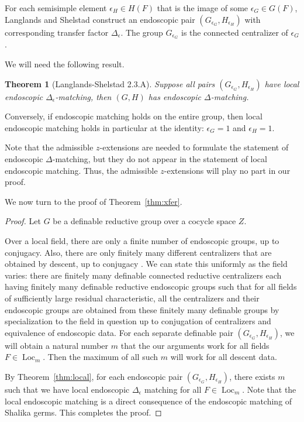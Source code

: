 \documentclass[12pt]{amsart}
\newcommand{\op}[1]{\operatorname{#1}}
\theoremstyle{plain}
\newtheorem{theorem}[thm]{Theorem}
\theoremstyle{definition}
\begin{document}
For each semisimple element $\epsilon_H \in H(F)$ that is the image of
some $\epsilon_G\in G(F)$, Langlands and Shelstad construct an
endoscopic pair $(G_{\epsilon_G},H_{\epsilon_H})$ with corresponding
transfer factor $\Delta_\epsilon$.  The group $G_{\epsilon_G}$ is the
connected centralizer of $\epsilon_G$.

We will need the following result.

\begin{theorem}[Langlands-Shelstad 2.3.A]  Suppose all pairs
  $(G_{\epsilon_G},H_{\epsilon_H})$ have local endoscopic
  $\Delta_\epsilon$-matching, then $(G,H)$ has endoscopic $\Delta$-matching.
\end{theorem}

Conversely, if endoscopic matching holds on the entire group, then
local endoscopic matching holds in particular at the identity:
$\epsilon_G = 1$ and $\epsilon_H =1$.

Note that the admissible $z$-extensions are needed to formulate the
statement of endoscopic $\Delta$-matching, but they do not appear in
the statement of local endoscopic matching.  Thus, the admissible
$z$-extensions will play no part in our proof.

We now turn to the proof of Theorem~\ref{thm:xfer}.

\begin{proof} Let $G$ be a definable reductive group over a cocycle
  space $Z$.

  Over a local field, there are only a finite number of endoscopic
  groups, up to conjugacy.  Also, there are only finitely many
  different centralizers that are obtained by descent, up to conjugacy
  \cite[Sec.2.2]{LSd}.  We can state this uniformly as the field
  varies: there are finitely many definable connected reductive
  centralizers each having finitely many definable reductive
  endoscopic groups such that for all fields of sufficiently large
  residual characteristic, all the centralizers and their endoscopic
  groups are obtained from these finitely many definable groups by
  specialization to the field in question up to conjugation of
  centralizers and equivalence of endoscopic data.  For each separate
  definable pair $(G_{\epsilon_G},H_{\epsilon_H})$, we will obtain a
  natural number $m$ that the our arguments work for all fields $F\in
  \op{Loc}_m$.  Then the maximum of all such $m$ will work for all
  descent data.

  By Theorem~\ref{thm:local}, for each endoscopic pair
  $(G_{\epsilon_G},H_{\epsilon_H})$, there exists $m$ such that we
  have local endoscopic $\Delta_\epsilon$ matching for all
  $F\in\op{Loc}_m$.  Note that the local endoscopic matching is
  a direct consequence of the endoscopic matching of Shalika germs.  This
  completes the proof.
\end{proof}
\end{document}
